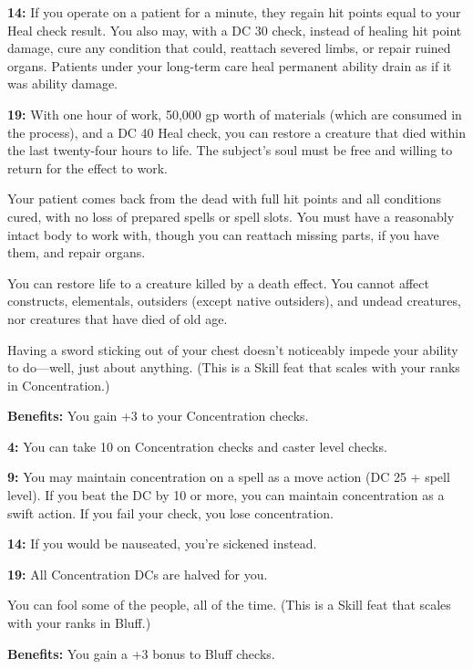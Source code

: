 \textbf{14:} If you operate on a patient for a minute, they regain hit points equal to your Heal check result. You also may, with a DC 30 check, instead of healing hit point damage, cure any condition that  could, reattach severed limbs, or repair ruined organs. Patients under your long-term care heal permanent ability drain as if it was ability damage.

\textbf{19:} With one hour of work, 50,000 gp worth of materials (which are consumed in the process), and a DC 40 Heal check, you can restore a creature that died within the last twenty-four hours to life. The subject's soul must be free and willing to return for the effect to work.

Your patient comes back from the dead with full hit points and all conditions cured, with no loss of prepared spells or spell slots. You must have a reasonably intact body to work with, though you can reattach missing parts, if you have them, and repair organs.

You can restore life to a creature killed by a death effect. You cannot affect constructs, elementals, outsiders (except native outsiders), and undead creatures, nor creatures that have died of old age.


Having a sword sticking out of your chest doesn't noticeably impede your ability to do—well, just about anything. (This is a Skill feat that scales with your ranks in Concentration.)

\textbf{Benefits:} You gain +3 to your Concentration checks.

\textbf{4:} You can take 10 on Concentration checks and caster level checks.

\textbf{9:} You may maintain concentration on a spell as a move action (DC 25 + spell level). If you beat the DC by 10 or more, you can maintain concentration as a swift action. If you fail your check, you lose concentration.

\textbf{14:} If you would be nauseated, you're sickened instead.

\textbf{19:} All Concentration DCs are halved for you.


You can fool some of the people, all of the time. (This is a Skill feat that scales with your ranks in Bluff.)

\textbf{Benefits:} You gain a +3 bonus to Bluff checks.

